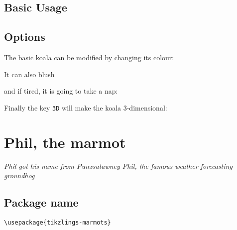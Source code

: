 \documentclass[parskip=half]{scrartcl}
\begin{document}
\subsection{Basic Usage}

\begin{tcblisting}{}
\koala
\end{tcblisting}

\subsection{Options}

The basic koala can be modified by changing its colour:
\begin{tcblisting}{}
\koala[body=blue]
\end{tcblisting}

It can also blush
\begin{tcblisting}{}
\koala[blush]
\end{tcblisting}

and if tired, it is going to take a nap:
\begin{tcblisting}{}
\koala[sleeping]
\end{tcblisting}

Finally the key \lstinline|3D| will make the koala 3-dimensional:
\begin{tcblisting}{}
\koala[3D]
\end{tcblisting}

%
%
\clearpage
\section[Marmot]{Phil, the marmot}

\emph{Phil got his name from Punxsutawney Phil, the famous weather forecasting groundhog}

\subsection{Package name}

\begin{tcolorbox}[lower separated=false, lefthand width=.8\linewidth]
\vspace*{0.5cm}
\lstinline|\usepackage{tikzlings-marmots}| 
\vspace*{0.5cm}
\end{tcolorbox}
\end{document}
